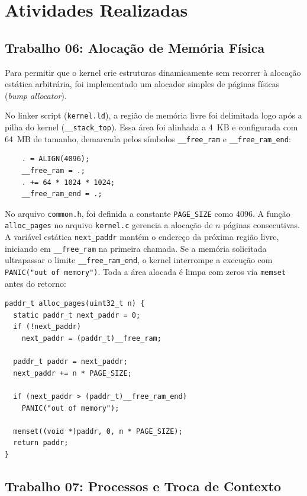 \documentclass[12pt]{article}
\begin{document}
\section{Atividades Realizadas}

\subsection{Trabalho 06: Alocação de Memória Física}

Para permitir que o kernel crie estruturas dinamicamente sem recorrer à alocação estática arbitrária, foi implementado um alocador simples de páginas físicas (\textit{bump allocator}).

No linker script (\texttt{kernel.ld}), a região de memória livre foi delimitada logo após a pilha do kernel (\texttt{\_\_stack\_top}). Essa área foi alinhada a 4~KB e configurada com 64~MB de tamanho, demarcada pelos símbolos \texttt{\_\_free\_ram} e \texttt{\_\_free\_ram\_end}:

\begin{verbatim}
    . = ALIGN(4096);
    __free_ram = .;
    . += 64 * 1024 * 1024;
    __free_ram_end = .;
\end{verbatim}

No arquivo \texttt{common.h}, foi definida a constante \texttt{PAGE\_SIZE} como 4096. A função \texttt{alloc\_pages} no arquivo \texttt{kernel.c} gerencia a alocação de $n$ páginas consecutivas. A variável estática \texttt{next\_paddr} mantém o endereço da próxima região livre, iniciando em \texttt{\_\_free\_ram} na primeira chamada. Se a memória solicitada ultrapassar o limite \texttt{\_\_free\_ram\_end}, o kernel interrompe a execução com \texttt{PANIC("out of memory")}. Toda a área alocada é limpa com zeros via \texttt{memset} antes do retorno:

\begin{verbatim}
paddr_t alloc_pages(uint32_t n) {
  static paddr_t next_paddr = 0;
  if (!next_paddr)
    next_paddr = (paddr_t)__free_ram;

  paddr_t paddr = next_paddr;
  next_paddr += n * PAGE_SIZE;

  if (next_paddr > (paddr_t)__free_ram_end)
    PANIC("out of memory");

  memset((void *)paddr, 0, n * PAGE_SIZE);
  return paddr;
}
\end{verbatim}

\subsection{Trabalho 07: Processos e Troca de Contexto}
\end{document}
